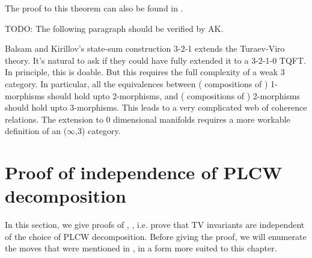 The proof to this theorem can also be found in \cite{balsam-kirillov}.

TODO: The following paragraph should be verified by AK.


 Balsam and Kirillov's state-sum construction  3-2-1 extends the Turaev-Viro 
 theory.  It's natural to ask if they could have fully extended it to a 3-2-1-0 TQFT.  
 In principle, this is doable. But this requires the full complexity of a weak 3 category.
In particular, all the equivalences between ( compositions of ) 1-morphisms 
should hold upto 2-morphisms, and ( compositions of ) 2-morphisms should hold 
 upto 3-morphisms. This leads to a very complicated web of coherence relations. 
 The extension to 0 dimensional manifolds requires a more workable definition of 
 an ($\infty$,3) category.


\section{Proof of independence of PLCW decomposition}\label{s:proof}

In this section, we give proofs of , ,
i.e. prove that TV invariants are independent of the choice of PLCW
decomposition. Before giving the proof, we will enumerate the 
moves that were mentioned in , in a form more suited 
to this chapter.

